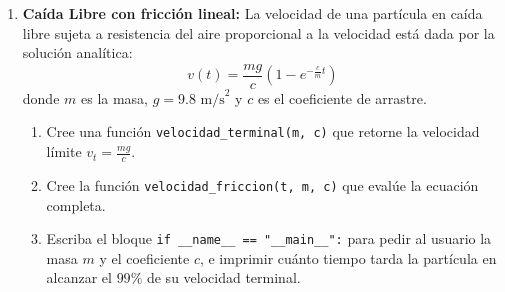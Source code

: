 \documentclass[12pt]{article}
\begin{document}
\begin{problemas}[]
\begin{enumerate}[leftmargin=*]
 \item \textbf{Caída Libre con fricción lineal:}
    La velocidad de una partícula en caída libre sujeta a resistencia del aire proporcional a la velocidad está dada por la solución analítica:
    $$ v(t) = \frac{m g}{c} \left( 1 - e^{-\frac{c}{m}t} \right) $$
    donde $m$ es la masa, $g = 9.8\text{ m/s}^2$ y $c$ es el coeficiente de arrastre.
    \begin{enumerate}
        \item Cree una función \lstinline|velocidad_terminal(m, c)| que retorne la velocidad límite $v_t = \frac{mg}{c}$.
        \item Cree la función \lstinline|velocidad_friccion(t, m, c)| que evalúe la ecuación completa.
        \item Escriba el bloque \lstinline|if __name__ == "__main__":| para pedir al usuario la masa $m$ y el coeficiente $c$, e imprimir cuánto tiempo tarda la partícula en alcanzar el $99\%$ de su velocidad terminal.
    \end{enumerate}   
\end{enumerate}

\end{problemas}
\end{document}
